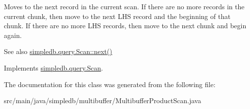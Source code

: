 Moves to the next record in the current scan. If there are no more records in the current chunk, then move to the next L\+HS record and the beginning of that chunk. If there are no more L\+HS records, then move to the next chunk and begin again. \begin{DoxySeeAlso}{See also}
\hyperlink{interfacesimpledb_1_1query_1_1Scan_a5fc77b7c76d91f89f6c09ac4f15ef351}{simpledb.\+query.\+Scan\+::next()} 
\end{DoxySeeAlso}


Implements \hyperlink{interfacesimpledb_1_1query_1_1Scan_a5fc77b7c76d91f89f6c09ac4f15ef351}{simpledb.\+query.\+Scan}.



The documentation for this class was generated from the following file\+:\begin{DoxyCompactItemize}
\item 
src/main/java/simpledb/multibuffer/Multibuffer\+Product\+Scan.\+java\end{DoxyCompactItemize}
